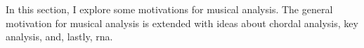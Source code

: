

In this section, I explore some motivations for musical analysis. The general motivation for musical analysis is extended with ideas about chordal analysis, key analysis, and, lastly, \gls{rna}.
